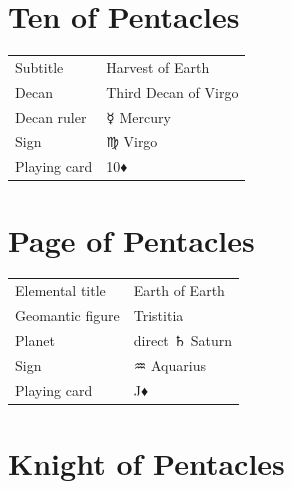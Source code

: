 \newpage
\section*{Ten of Pentacles}

\begin{center}
\end{center}

\vspace{4mm}
\noindent\begin{tabular}{@{}l@{\quad}l@{}}
Subtitle & Harvest of Earth \\
Decan & Third Decan of Virgo \\
Decan ruler & {\symbfont ☿} Mercury \\
Sign & {\symbfont ♍} Virgo \\
Playing card & 10♦ \\
\end{tabular}

\newpage
\section*{Page of Pentacles}

\begin{center}
\end{center}

\vspace{4mm}
\noindent\begin{tabular}{@{}l@{\quad}l@{}}
Elemental title & Earth of Earth \\
Geomantic figure & Tristitia \\
Planet & direct {\symbfont ♄} Saturn \\
Sign & {\symbfont ♒} Aquarius \\
Playing card & J♦ \\
\end{tabular}

\newpage
\section*{Knight of Pentacles}

\begin{center}
\end{center}

